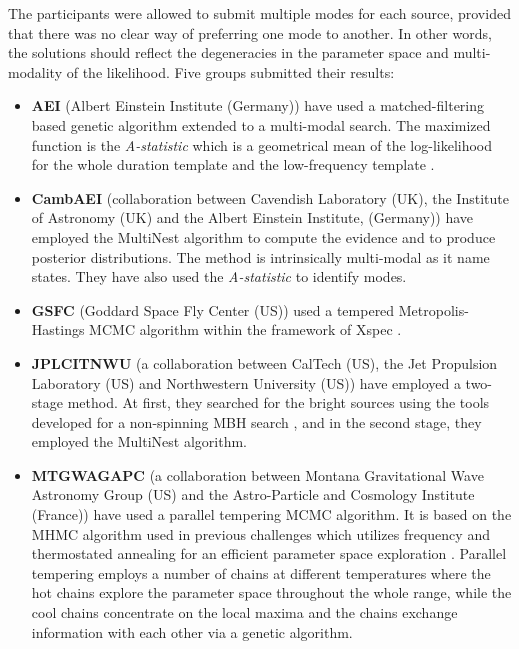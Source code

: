 \documentclass{iopart}
\begin{document}
The participants were allowed to submit multiple modes for each source, provided that there was no clear way of preferring one mode to another. In other words, the solutions should reflect the degeneracies in the parameter space and multi-modality of the
likelihood. Five groups submitted their results: 
\begin{itemize}
\item \textbf{AEI} (Albert Einstein Institute (Germany))  have used a matched-filtering based genetic algorithm extended to a multi-modal search. The maximized function is the {\em A-statistic} which is a geometrical mean of the log-likelihood for the whole duration template and the low-frequency template \cite{GAspinbbhFullPaper}.

\item \textbf{CambAEI} (collaboration between Cavendish Laboratory (UK), the Institute of Astronomy (UK) and the Albert Einstein Institute, (Germany)) have employed the MultiNest algorithm \cite{MultiNest2} to compute the 
evidence and to produce posterior distributions. The method is intrinsically multi-modal as it name states. They have 
also used the {\em A-statistic} to identify modes.

\item \textbf{GSFC} (Goddard Space Fly Center (US)) used a tempered Metropolis-Hastings MCMC algorithm within the framework of Xspec \cite{Xspec}. 

\item \textbf{JPLCITNWU} (a collaboration between  CalTech (US),  the Jet Propulsion Laboratory (US)  
and Northwestern University (US)) have employed a two-stage method. At first, they searched for the bright sources using the tools developed for a non-spinning MBH search \cite{JPLCaltech}, and in the second stage, they employed  the MultiNest algorithm.

\item \textbf{MTGWAGAPC} (a collaboration between Montana Gravitational Wave Astronomy Group (US) and  
the Astro-Particle and Cosmology Institute (France)) have used a parallel tempering MCMC algorithm. It is based on the MHMC algorithm used in previous challenges which utilizes frequency and thermostated annealing for an efficient parameter space exploration \cite{SMBHCornishPorter}. Parallel tempering employs a number of chains
 at different temperatures where the hot chains explore the parameter space throughout the whole range, while the cool chains concentrate on the local maxima and the chains exchange information with each other via a genetic algorithm.

\end{itemize}
\end{document}
